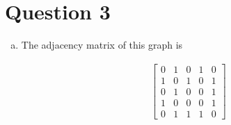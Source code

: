 \documentclass[12pt]{article}
\begin{document}
\section*{Question 3}
\begin{enumerate}[a.]
    \item

    The adjacency matrix of this graph is

    \setcounter{equation}{0}
    \begin{align}
    \begin{bmatrix}
    0 & 1 & 0 & 1 & 0\\
    1 & 0 & 1 & 0 & 1\\
    0 & 1 & 0 & 0 & 1\\
    1 & 0 & 0 & 0 & 1\\
    0 & 1 & 1 & 1 & 0
    \end{bmatrix}
    \end{align}
\end{enumerate}
\end{document}
